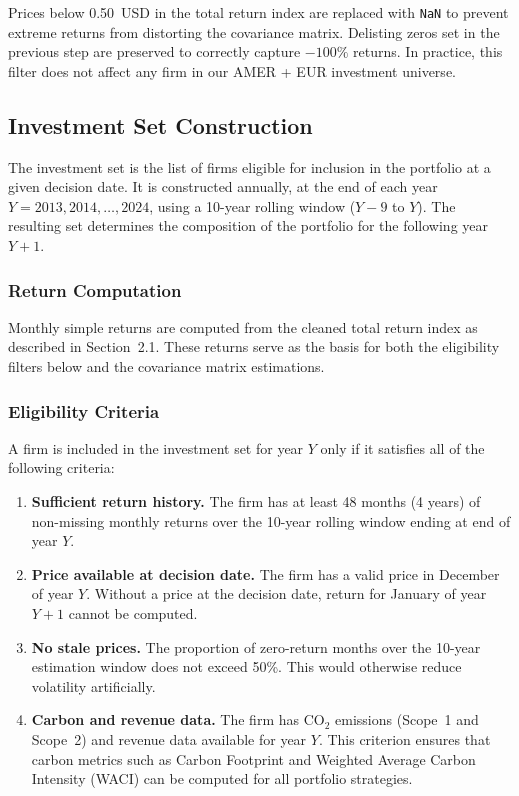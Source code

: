 \documentclass[11pt,a4paper]{article}
\begin{document}
Prices below 0.50~USD in the total return index are replaced with \texttt{NaN} to prevent extreme returns from distorting the covariance matrix. Delisting zeros set in the previous step are preserved to correctly capture $-100\%$ returns. In practice, this filter does not affect any firm in our AMER + EUR investment universe.

\subsection{Investment Set Construction}

The investment set is the list of firms eligible for inclusion in the portfolio at a given decision date. It is constructed annually, at the end of each year \(Y = 2013, 2014, \dots, 2024\), using a 10-year rolling window (\(Y{-}9\) to \(Y\)). The resulting set determines the composition of the portfolio for the following year \(Y+1\). 

\subsubsection{Return Computation}

Monthly simple returns are computed from the cleaned total return index as described in Section~2.1. These returns serve as the basis for both the eligibility filters below and the covariance matrix estimations.

\subsubsection{Eligibility Criteria}

A firm is included in the investment set for year \(Y\) only if it satisfies all of the following criteria:

\begin{enumerate}[leftmargin=*]
    \item \textbf{Sufficient return history.} The firm has at least 48 months (4 years) of non-missing monthly returns over the 10-year rolling window ending at end of year \(Y\).

    \item \textbf{Price available at decision date.} The firm has a valid price in December of year \(Y\). Without a price at the decision date, return for January of year \(Y+1\) cannot be computed.

    \item \textbf{No stale prices.} The proportion of zero-return months over the 10-year estimation window does not exceed 50\%. This would otherwise reduce volatility artificially.

    \item \textbf{Carbon and revenue data.} The firm has CO\(_2\) emissions (Scope~1 and Scope~2) and revenue data available for year \(Y\). This criterion ensures that carbon metrics such as Carbon Footprint  and Weighted Average Carbon Intensity (WACI) can be computed for all portfolio strategies.
\end{enumerate}
\end{document}
